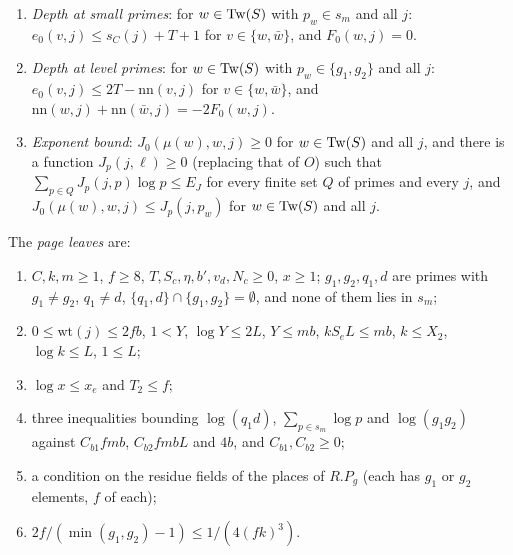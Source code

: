 \begin{definition}[Leaves]
\begin{enumerate}[label=(L\arabic*)]
  $e_0(v,j)\le s_B(j)+T+1$ for $v\in\{w,\bar w\}$; $F_0(w,j)=0$ if $p_w=q_1$; and $-2fkb'\le F_0(w,j)\le0$ if $p_w=d$.
\item\label{pf:onto2:L8} \emph{Depth at small primes}: for $w\in\mathrm{Tw}(S)$ with $p_w\in s_m$ and all $j$: $e_0(v,j)\le
  s_C(j)+T+1$ for $v\in\{w,\bar w\}$, and $F_0(w,j)=0$.
\item\label{pf:onto2:L9} \emph{Depth at level primes}: for $w\in\mathrm{Tw}(S)$ with $p_w\in\{g_1,g_2\}$ and all $j$:
  $e_0(v,j)\le 2T-\mathrm{nn}(v,j)$ for $v\in\{w,\bar w\}$, and $\mathrm{nn}(w,j)+\mathrm{nn}(\bar w,j)=-2F_0(w,j)$.
\item\label{pf:onto2:L10} \emph{Exponent bound}: $J_0(\mu(w),w,j)\ge0$ for $w\in\mathrm{Tw}(S)$ and all $j$, and there is a
  function $J_p(j,\ell)\ge0$ (replacing that of $O$) such that $\sum_{p\in Q}J_p(j,p)\log p\le E_J$ for every finite set $Q$
  of primes and every $j$, and $J_0(\mu(w),w,j)\le J_p(j,p_w)$ for $w\in\mathrm{Tw}(S)$ and all $j$.
\end{enumerate}
The \emph{page leaves} are:
\begin{enumerate}[label=(P\arabic*)]
\item\label{pf:onto2:P1} $C,k,m\ge1$, $f\ge8$, $T,S_c,\eta,b',v_d,N_c\ge0$, $x\ge1$; $g_1,g_2,q_1,d$ are primes with $g_1\ne
  g_2$, $q_1\ne d$, $\{q_1,d\}\cap\{g_1,g_2\}=\emptyset$, and none of them lies in $s_m$;
\item\label{pf:onto2:P2} $0\le\mathrm{wt}(j)\le2fb$, $1<Y$, $\log Y\le 2L$, $Y\le mb$, $kS_eL\le mb$, $k\le X_2$, $\log k\le L$,
  $1\le L$;
\item\label{pf:onto2:P3} $\log x\le x_e$ and $T_2\le f$;
\item\label{pf:onto2:P4} three inequalities bounding $\log(q_1d)$, $\sum_{p\in s_m}\log p$ and $\log(g_1g_2)$ against
  $C_{b1}fmb$, $C_{b2}fmbL$ and $4b$, and $C_{b1},C_{b2}\ge0$;
\item\label{pf:onto2:P5} a condition on the residue fields of the places of $R.P_g$ (each has $g_1$ or $g_2$ elements, $f$ of each);
\item\label{pf:onto2:P6} $2f/(\min(g_1,g_2)-1)\le 1/(4(fk)^3)$.
\end{enumerate}
\end{definition}

